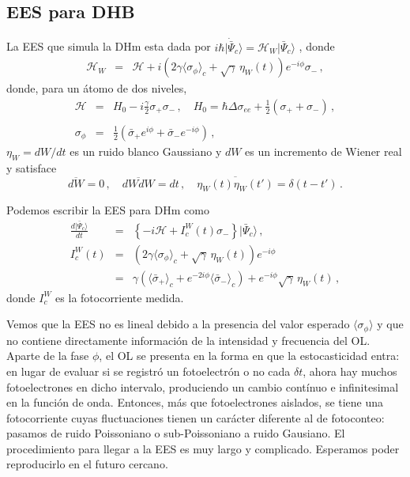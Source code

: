 \documentclass[twocolumn,aps,eqsecnum,showkeys,amsmath]{revtex4}
\newcommand{\mcH}{\mathcal{H}} 	%
\providecommand{\vxp}[1]{\langle #1 \rangle}
\providecommand{\ket}[1]{\lvert #1 \rangle}
\begin{document}
\subsection{EES para DHB} 
La EES que simula la DHm esta dada por 
$i \hbar \ket{\dot{\bar{\Psi}}_c} = {\mcH}_W \ket{\bar{\Psi}_c}$ 
\cite{Carmichael93,WiMi93b}, donde 
%
\begin{eqnarray} 	\label{eq:HamiltonianHDm}
\mcH_W &=& \mcH + i \left(2 \gamma \langle \sigma_{\phi}  \rangle_c  
	+ \sqrt{\gamma} \,\eta_W(t) \right) e^{-i\phi}  \sigma_- \,,	
\end{eqnarray}
donde, para un \'atomo de dos niveles, 
%
\begin{eqnarray}
\mcH &=& H_0 - i \frac{\gamma}{2} \sigma_+ \sigma_-   \,, \quad 
	H_0 = \hbar \Delta \sigma_{ee} +\frac{1}{2} (\sigma_+ +\sigma_-) \,, 
	\nonumber \\ \\ 
\sigma_{\phi}  
	&=& \frac{1}{2}(\bar{\sigma}_+ e^{i\phi} +\bar{\sigma}_- e^{-i\phi} ) \,,
\end{eqnarray}
$\eta_W=dW/dt$ es un ruido blanco Gaussiano y $dW$ es un incremento 
de Wiener real y satisface 
%
\begin{equation} 	\label{eq:GaussianNoise}
\overline{dW} =0 \,, 	\quad \overline{dWdW} =dt \,, \quad 
	\overline{\eta_W(t) \eta_W(t')} = \delta(t-t') \,.
\end{equation}

Podemos escribir la EES para DHm como 
%
\begin{subequations}
\begin{eqnarray}
\frac{d \ket{\bar{\Psi}_c}}{dt} 
	&=& \left\{ -i \mcH   +I_c^W(t) \sigma_- \right\}  \ket{\bar{\Psi}_c}   \,,	 \\
I_c^W(t) &=& \left(2 \gamma \langle \sigma_{\phi}  \rangle_c  
	+ \sqrt{\gamma} \,\eta_W(t) \right) e^{-i\phi} 		\\
&=& \gamma \left( \vxp{\bar{\sigma}_+}_c  
	+e^{-2i\phi} \vxp{\bar{\sigma}_-}_c \right) 
	+e^{-i\phi} \sqrt{\gamma} \, \eta_W(t)	\,,	\nonumber 
	\nonumber \label{HomodyneSSE} 
\end{eqnarray}
\end{subequations}
donde $I_c^W$ es la fotocorriente medida. 

Vemos que la EES no es lineal debido a la presencia del valor esperado 
$\langle \sigma_{\phi} \rangle$ y que no contiene directamente 
informaci\'on de la intensidad y frecuencia del OL. Aparte de la fase 
$\phi$, el OL se presenta en la forma en que la estocasticidad entra: en 
lugar de evaluar si se registr\'o un fotoelectr\'on o no cada $\delta t$, 
ahora hay muchos fotoelectrones en dicho intervalo, produciendo un 
cambio cont\'inuo e infinitesimal en la funci\'on de onda. Entonces, m\'as 
que fotoelectrones aislados, se tiene una fotocorriente cuyas fluctuaciones 
tienen un car\'acter diferente al de fotoconteo: pasamos de ruido 
Poissoniano o sub-Poissoniano a ruido Gausiano. El procedimiento para 
llegar a la EES es muy largo y complicado. Esperamos poder reproducirlo 
en el futuro cercano. 
\end{document}
